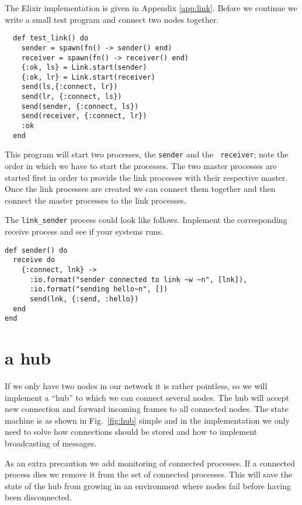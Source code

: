 \documentclass[a4paper,11pt]{article}
\begin{document}
The Elixir implementation is given in Appendix \ref{app:link}. Before
we continue we write a small test program and connect two nodes
together.

\begin{lstlisting}
  def test_link() do
    sender = spawn(fn() -> sender() end)
    receiver = spawn(fn() -> receiver() end)
    {:ok, ls} = Link.start(sender)
    {:ok, lr} = Link.start(receiver)
    send(ls,{:connect, lr})
    send(lr, {:connect, ls})
    send(sender, {:connect, ls})
    send(receiver, {:connect, lr})
    :ok
  end
\end{lstlisting}  

This program will start two processes, the {\tt sender} and the {\tt
  receiver};  note the order in which we have to start the
processes. The two master processes are started first in order to
provide the link processes with their respective master. Once the link
processes are created we can connect them together and then connect
the master processes to the link processes.

The {\tt link\_sender} process could look like follows. Implement the
corresponding receive process and see if your systems runs.

\begin{lstlisting}
def sender() do
  receive do
    {:connect, lnk} ->
      :io.format("sender connected to link ~w ~n", [lnk]),
      :io.format("sending hello~n", [])
      send(lnk, {:send, :hello})
  end
end            
\end{lstlisting}

\section{a hub}

If we only have two nodes in our network it is rather pointless, so we
will implement a ``hub'' to which we can connect several nodes. The hub
will accept new connection and forward incoming frames to all
connected nodes. The state machine is as shown in Fig.~\ref{fig:hub}
simple and in the implementation we only need to solve how connections
should be stored and how to implement broadcasting of messages.

As an extra precaution we add monitoring of connected processes. If a
connected process dies we remove it from the set of connected
processes. This will save the state of the hub from growing in an
environment where nodes fail before having been disconnected.
\end{document}
